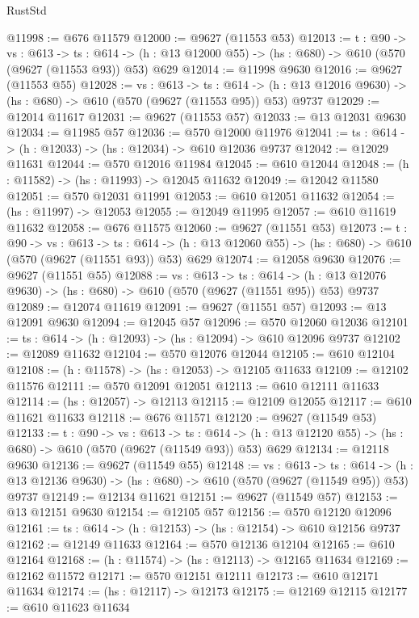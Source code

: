 \begin{lexlean}{RustStd}
\begin{coremodule}
@11998 := @676 @11579
@12000 := @9627 (@11553 @53)
@12013 := {t : @90} ->
  {vs : @613} ->
  {ts : @614} -> (h : @13 @12000 @55) -> (hs : @680) -> @610 (@570 (@9627 (@11553 @93)) @53) @629
@12014 := @11998 @9630
@12016 := @9627 (@11553 @55)
@12028 := {vs : @613} ->
  {ts : @614} -> (h : @13 @12016 @9630) -> (hs : @680) -> @610 (@570 (@9627 (@11553 @95)) @53) @9737
@12029 := @12014 @11617
@12031 := @9627 (@11553 @57)
@12033 := @13 @12031 @9630
@12034 := @11985 @57
@12036 := @570 @12000 @11976
@12041 := {ts : @614} -> (h : @12033) -> (hs : @12034) -> @610 @12036 @9737
@12042 := @12029 @11631
@12044 := @570 @12016 @11984
@12045 := @610 @12044
@12048 := (h : @11582) -> (hs : @11993) -> @12045 @11632
@12049 := @12042 @11580
@12051 := @570 @12031 @11991
@12053 := @610 @12051 @11632
@12054 := (hs : @11997) -> @12053
@12055 := @12049 @11995
@12057 := @610 @11619 @11632
@12058 := @676 @11575
@12060 := @9627 (@11551 @53)
@12073 := {t : @90} ->
  {vs : @613} ->
  {ts : @614} -> (h : @13 @12060 @55) -> (hs : @680) -> @610 (@570 (@9627 (@11551 @93)) @53) @629
@12074 := @12058 @9630
@12076 := @9627 (@11551 @55)
@12088 := {vs : @613} ->
  {ts : @614} -> (h : @13 @12076 @9630) -> (hs : @680) -> @610 (@570 (@9627 (@11551 @95)) @53) @9737
@12089 := @12074 @11619
@12091 := @9627 (@11551 @57)
@12093 := @13 @12091 @9630
@12094 := @12045 @57
@12096 := @570 @12060 @12036
@12101 := {ts : @614} -> (h : @12093) -> (hs : @12094) -> @610 @12096 @9737
@12102 := @12089 @11632
@12104 := @570 @12076 @12044
@12105 := @610 @12104
@12108 := (h : @11578) -> (hs : @12053) -> @12105 @11633
@12109 := @12102 @11576
@12111 := @570 @12091 @12051
@12113 := @610 @12111 @11633
@12114 := (hs : @12057) -> @12113
@12115 := @12109 @12055
@12117 := @610 @11621 @11633
@12118 := @676 @11571
@12120 := @9627 (@11549 @53)
@12133 := {t : @90} ->
  {vs : @613} ->
  {ts : @614} -> (h : @13 @12120 @55) -> (hs : @680) -> @610 (@570 (@9627 (@11549 @93)) @53) @629
@12134 := @12118 @9630
@12136 := @9627 (@11549 @55)
@12148 := {vs : @613} ->
  {ts : @614} -> (h : @13 @12136 @9630) -> (hs : @680) -> @610 (@570 (@9627 (@11549 @95)) @53) @9737
@12149 := @12134 @11621
@12151 := @9627 (@11549 @57)
@12153 := @13 @12151 @9630
@12154 := @12105 @57
@12156 := @570 @12120 @12096
@12161 := {ts : @614} -> (h : @12153) -> (hs : @12154) -> @610 @12156 @9737
@12162 := @12149 @11633
@12164 := @570 @12136 @12104
@12165 := @610 @12164
@12168 := (h : @11574) -> (hs : @12113) -> @12165 @11634
@12169 := @12162 @11572
@12171 := @570 @12151 @12111
@12173 := @610 @12171 @11634
@12174 := (hs : @12117) -> @12173
@12175 := @12169 @12115
@12177 := @610 @11623 @11634

\end{coremodule}
\end{lexlean}
